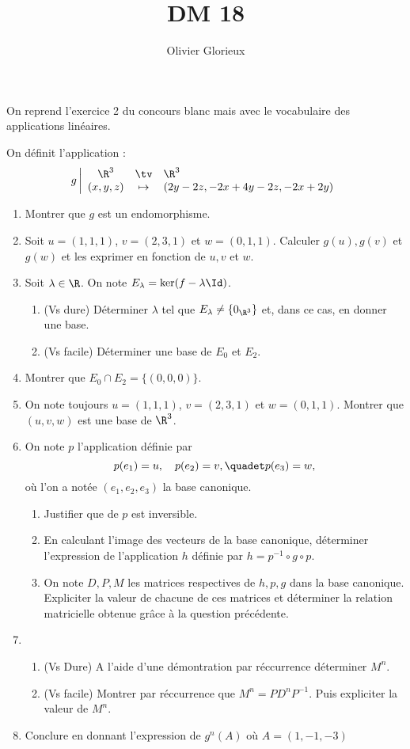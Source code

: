 \documentclass[a4paper, 11pt,reqno]{article}
\author{Olivier Glorieux}
\begin{document}
\title{DM 18}

On reprend l'exercice 2 du concours blanc mais avec le vocabulaire des applications linéaires. 

\begin{exercice}
On définit l'application : 
$$g \left| \begin{array}{ccl}
\R^3 &\tv& \R^3 \\
(x,y,z) &\mapsto & (2y-2z, -2x+4y-2z, -2x+2y)
\end{array}\right.$$
\begin{enumerate}
\item Montrer que $g$ est un endomorphisme. 
\item Soit $u=(1,1,1)$, $v=(2,3,1)$ et $w=(0,1,1)$. Calculer $g(u), g(v)$ et $g(w)$ et les exprimer en fonction de $u, v$ et $w$.
\item Soit $\lambda \in \R$.  On note $E_\lambda = \ker(f-\lambda \Id)$. 
\begin{enumerate}
\item (Vs dure) Déterminer $\lambda $ tel que $E_\lambda \neq \{ 0_{\R^3}\} $ et, dans ce cas, en donner une base.
\item (Vs facile) Déterminer une base de $E_0$ et $E_2$.  
\end{enumerate}
\item Montrer que $E_0\cap E_2= \{ (0,0,0)\}$.
\item On note toujours $u=(1,1,1)$, $v=(2,3,1)$ et $w=(0,1,1)$. Montrer que $(u,v,w)$ est une base de $\R^3$. 
\item On note $p$ l'application définie par
$$p(e_1) =u, \quad p(e_2)=v,\quadet p(e_3)=w,$$
où l'on a notée $(e_1,e_2, e_3) $ la base canonique.
 \begin{enumerate}
 \item Justifier que de $p$ est inversible. 
 \item En calculant l'image des vecteurs de la base canonique, déterminer l'expression de l'application $h$ définie par $h=p^{-1} \circ g \circ p$. 
 \item On note $D, P, M$ les matrices respectives de $h, p, g$ dans la base canonique. Expliciter la valeur de chacune de ces matrices et déterminer la relation matricielle obtenue grâce à la question précédente. 
 \end{enumerate}
\item \begin{enumerate}
\item (Vs Dure) A l'aide d'une démontration par réccurrence déterminer $M^n$.
\item (Vs facile) Montrer  par réccurrence  que $M^n=PD^nP^{-1}$. Puis expliciter la valeur de $M^n$.
\end{enumerate}


\item Conclure en donnant l'expression de $g^n(A)$ où $A=(1,-1,-3)$
\end{enumerate}
\end{exercice}
\end{document}
